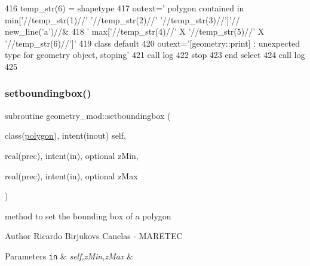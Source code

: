 \begin{DoxyCode}
416         temp\_str(6) = shapetype%
417         outext=\textcolor{stringliteral}{'      polygon contained in min['}//temp\_str(1)//\textcolor{stringliteral}{' '}//temp\_str(2)//\textcolor{stringliteral}{' '}//temp\_str(3)//\textcolor{stringliteral}{']'}//
      new\_line(\textcolor{stringliteral}{'a'})//&
418             \textcolor{stringliteral}{'       max['}//temp\_str(4)//\textcolor{stringliteral}{' X '}//temp\_str(5)//\textcolor{stringliteral}{' X '}//temp\_str(6)//\textcolor{stringliteral}{']'}
419 \textcolor{keywordflow}{        class default}
420         outext=\textcolor{stringliteral}{'[geometry::print] : unexpected type for geometry object, stoping'}
421         \textcolor{keyword}{call }log%
422         stop
423 \textcolor{keywordflow}{    end select}
424     \textcolor{keyword}{call }log%
425 
\end{DoxyCode}
\mbox{\label{namespacegeometry__mod_a41e0a6999c6edccb70fe20ec80d32709}} 
\subsubsection{\texorpdfstring{setboundingbox()}{setboundingbox()}}
{\footnotesize\ttfamily subroutine geometry\+\_\+mod\+::setboundingbox (\begin{DoxyParamCaption}\item[{class(\mbox{\hyperlink{structgeometry__mod_1_1polygon}{polygon}}), intent(inout)}]{self,  }\item[{real(prec), intent(in), optional}]{z\+Min,  }\item[{real(prec), intent(in), optional}]{z\+Max }\end{DoxyParamCaption})\hspace{0.3cm}{\ttfamily [private]}}



method to set the bounding box of a polygon 

\begin{DoxyAuthor}{Author}
Ricardo Birjukovs Canelas -\/ M\+A\+R\+E\+T\+EC 
\end{DoxyAuthor}

\begin{DoxyParams}[1]{Parameters}
\mbox{\tt in}  & {\em self,z\+Min,z\+Max} & \\
\hline
\end{DoxyParams}


